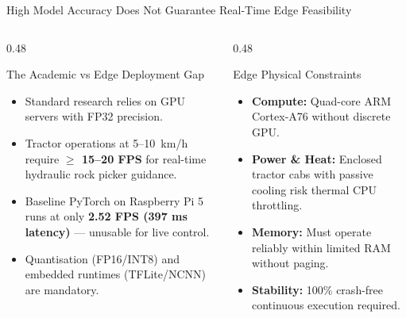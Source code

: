 \documentclass[aspectratio=169,10pt]{beamer}
\begin{document}
\begin{frame}{High Model Accuracy Does Not Guarantee Real-Time Edge Feasibility}
\begin{columns}[T]
  \begin{column}{0.48\textwidth}
    \begin{block}{\small The Academic vs Edge Deployment Gap}
      \small
      \begin{itemize}
        \item Standard research relies on GPU servers with FP32 precision.
        \item Tractor operations at 5--10~km/h require \textbf{$\ge$ 15--20 FPS} for real-time hydraulic rock picker guidance.
        \item Baseline PyTorch on Raspberry Pi 5 runs at only \textbf{2.52 FPS (397 ms latency)} --- unusable for live control.
        \item Quantisation (FP16/INT8) and embedded runtimes (TFLite/NCNN) are mandatory.
      \end{itemize}
    \end{block}
  \end{column}
  \begin{column}{0.48\textwidth}
    \begin{block}{\small Edge Physical Constraints}
      \small
      \begin{itemize}
        \item \textbf{Compute:} Quad-core ARM Cortex-A76 without discrete GPU.
        \item \textbf{Power \& Heat:} Enclosed tractor cabs with passive cooling risk thermal CPU throttling.
        \item \textbf{Memory:} Must operate reliably within limited RAM without paging.
        \item \textbf{Stability:} 100\% crash-free continuous execution required.
      \end{itemize}
    \end{block}
  \end{column}
\end{columns}
\end{frame}
\end{document}
